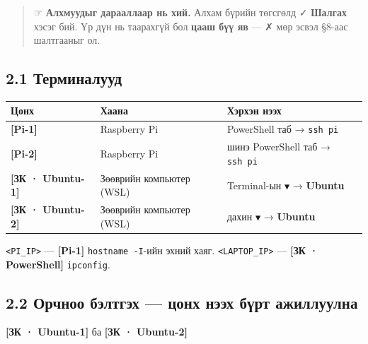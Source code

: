 \begin{quote}
☞ \textbf{Алхмуудыг дарааллаар нь хий.} Алхам бүрийн төгсгөлд ✓ \textbf{Шалгах} хэсэг бий. Үр дүн нь таарахгүй бол \textbf{цааш бүү яв} --- ✗ мөр эсвэл §8-аас шалтгааныг ол.
\end{quote}

\hypertarget{ux442ux435ux440ux43cux438ux43dux430ux43bux443ux443ux434}{%
\subsection{2.1 Терминалууд}\label{ux442ux435ux440ux43cux438ux43dux430ux43bux443ux443ux434}}

\begingroup\scriptsize\begin{longtable}[]{@{}lll@{}}
\toprule
Цонх & Хаана & Хэрхэн нээх\tabularnewline
\midrule
\endhead
\textbf{{[}Pi-1{]}} & Raspberry Pi & PowerShell таб → \texttt{ssh\ pi}\tabularnewline
\textbf{{[}Pi-2{]}} & Raspberry Pi & шинэ PowerShell таб → \texttt{ssh\ pi}\tabularnewline
\textbf{{[}ЗК · Ubuntu-1{]}} & Зөөврийн компьютер (WSL) & Terminal-ын \texttt{▼} → \textbf{Ubuntu}\tabularnewline
\textbf{{[}ЗК · Ubuntu-2{]}} & Зөөврийн компьютер (WSL) & дахин \texttt{▼} → \textbf{Ubuntu}\tabularnewline
\bottomrule
\end{longtable}\endgroup

\texttt{\textless{}PI\_\allowbreak{}IP\textgreater{}} --- \textbf{{[}Pi-1{]}} \texttt{hostname\ -I}-ийн эхний хаяг. \texttt{\textless{}LAPTOP\_\allowbreak{}IP\textgreater{}} --- \textbf{{[}ЗК · PowerShell{]}} \texttt{ipconfig}.

\hypertarget{ux43eux440ux447ux43dux43eux43e-ux431ux44dux43bux442ux433ux44dux445-ux446ux43eux43dux445-ux43dux44dux44dux445-ux431ux4afux440ux442-ux430ux436ux438ux43bux43bux443ux443ux43bux43dux430}{%
\subsection{\texorpdfstring{2.2 Орчноо бэлтгэх --- \textbf{цонх нээх бүрт} ажиллуулна}{2.2 Орчноо бэлтгэх --- цонх нээх бүрт ажиллуулна}}\label{ux43eux440ux447ux43dux43eux43e-ux431ux44dux43bux442ux433ux44dux445-ux446ux43eux43dux445-ux43dux44dux44dux445-ux431ux4afux440ux442-ux430ux436ux438ux43bux43bux443ux443ux43bux43dux430}}

\textbf{{[}ЗК · Ubuntu-1{]}} ба \textbf{{[}ЗК · Ubuntu-2{]}}

\begin{Shaded}
\begin{Highlighting}[]
\KeywordTok{\&\&} 
  \KeywordTok{|} \VariableTok{)}
  \KeywordTok{|} \VariableTok{)}
\end{Highlighting}
\end{Shaded}

